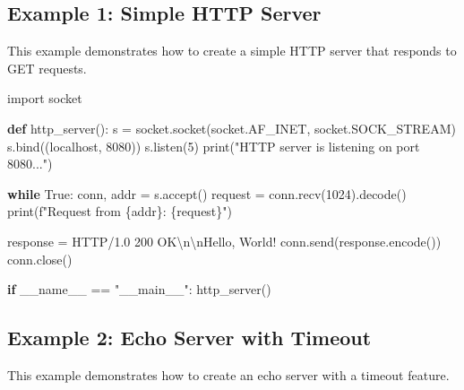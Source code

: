 \documentclass[
  letterpaper,
  DIV=11,
  numbers=noendperiod]{scrreprt}
\newenvironment{Shaded}{\begin{snugshade}}{\end{snugshade}}
\newcommand{\BuiltInTok}[1]{\textcolor[rgb]{0.00,0.23,0.31}{#1}}
\newcommand{\CharTok}[1]{\textcolor[rgb]{0.13,0.47,0.30}{#1}}
\newcommand{\ControlFlowTok}[1]{\textcolor[rgb]{0.00,0.23,0.31}{\textbf{#1}}}
\newcommand{\DecValTok}[1]{\textcolor[rgb]{0.68,0.00,0.00}{#1}}
\newcommand{\ImportTok}[1]{\textcolor[rgb]{0.00,0.46,0.62}{#1}}
\newcommand{\KeywordTok}[1]{\textcolor[rgb]{0.00,0.23,0.31}{\textbf{#1}}}
\newcommand{\NormalTok}[1]{\textcolor[rgb]{0.00,0.23,0.31}{#1}}
\newcommand{\OperatorTok}[1]{\textcolor[rgb]{0.37,0.37,0.37}{#1}}
\newcommand{\SpecialCharTok}[1]{\textcolor[rgb]{0.37,0.37,0.37}{#1}}
\newcommand{\SpecialStringTok}[1]{\textcolor[rgb]{0.13,0.47,0.30}{#1}}
\newcommand{\StringTok}[1]{\textcolor[rgb]{0.13,0.47,0.30}{#1}}
\newcommand{\VariableTok}[1]{\textcolor[rgb]{0.07,0.07,0.07}{#1}}
\begin{document}
\subsection{Example 1: Simple HTTP
Server}\label{example-1-simple-http-server}

This example demonstrates how to create a simple HTTP server that
responds to GET requests.

\begin{Shaded}
\begin{Highlighting}[]
\ImportTok{import}\NormalTok{ socket}

\KeywordTok{def}\NormalTok{ http\_server():}
\NormalTok{    s }\OperatorTok{=}\NormalTok{ socket.socket(socket.AF\_INET, socket.SOCK\_STREAM)}
\NormalTok{    s.bind((}\StringTok{\textquotesingle{}localhost\textquotesingle{}}\NormalTok{, }\DecValTok{8080}\NormalTok{))}
\NormalTok{    s.listen(}\DecValTok{5}\NormalTok{)}
    \BuiltInTok{print}\NormalTok{(}\StringTok{"HTTP server is listening on port 8080..."}\NormalTok{)}
    
    \ControlFlowTok{while} \VariableTok{True}\NormalTok{:}
\NormalTok{        conn, addr }\OperatorTok{=}\NormalTok{ s.accept()}
\NormalTok{        request }\OperatorTok{=}\NormalTok{ conn.recv(}\DecValTok{1024}\NormalTok{).decode()}
        \BuiltInTok{print}\NormalTok{(}\SpecialStringTok{f"Request from }\SpecialCharTok{\{}\NormalTok{addr}\SpecialCharTok{\}}\SpecialStringTok{: }\SpecialCharTok{\{}\NormalTok{request}\SpecialCharTok{\}}\SpecialStringTok{"}\NormalTok{)}
        
\NormalTok{        response }\OperatorTok{=} \StringTok{\textquotesingle{}HTTP/1.0 200 OK}\CharTok{\textbackslash{}n\textbackslash{}n}\StringTok{Hello, World!\textquotesingle{}}
\NormalTok{        conn.send(response.encode())}
\NormalTok{        conn.close()}

\ControlFlowTok{if} \VariableTok{\_\_name\_\_} \OperatorTok{==} \StringTok{"\_\_main\_\_"}\NormalTok{:}
\NormalTok{    http\_server()}
\end{Highlighting}
\end{Shaded}

\subsection{Example 2: Echo Server with
Timeout}\label{example-2-echo-server-with-timeout}

This example demonstrates how to create an echo server with a timeout
feature.
\end{document}
